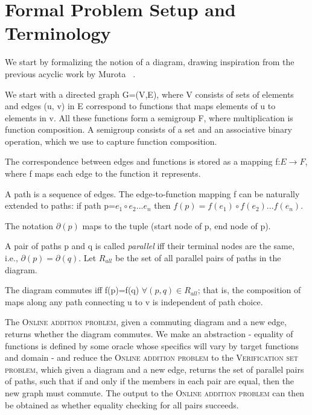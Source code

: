 \documentclass[sigplan,review,anonymous]{acmart}
\begin{document}
\section{Formal Problem Setup and Terminology}

We start by formalizing the notion of a diagram, drawing inspiration from the previous acyclic work by Murota ~\cite{commutative}.


We start with a directed graph G=(V,E), where V consists of sets of elements and edges (u, v) in E correspond to functions that maps elements of u to elements in v.
All these functions form a semigroup F, where multiplication is function composition.
A semigroup consists of a set and an associative binary operation, which we use to capture function composition.

The correspondence between edges and functions is stored as a mapping f:$E\rightarrow F$, where f maps each edge to the function it represents.

A path is a sequence of edges. The edge-to-function mapping f can be naturally extended to paths: if path p=$e_1\circ e_2 ... e_n$ then $f(p)=f(e_1) \circ f(e_2) ... f(e_n)$.

The notation $\partial(p)$ maps to the tuple (start node of p, end node of p).

A pair of paths p and q is called \textit{parallel} iff their terminal nodes are the same, i.e., $\partial(p)=\partial(q)$.
Let $R_{all}$ be the set of all parallel pairs of paths in the diagram.

The diagram commutes iff f(p)=f(q) $\forall (p,q)\in R_{all}$; that is, the composition of maps along any path connecting u to v is independent of path choice.

The \textsc{Online addition problem}, given a commuting diagram and a new edge, returns whether the diagram commutes.
We make an abstraction - equality of functions is defined by some oracle whose specifics will vary by target functions and domain - and reduce the \textsc{Online addition problem} to the \textsc{Verification set problem}, which given a diagram and a new edge, returns the set of parallel pairs of paths, such that if and only if the members in each pair are equal, then the new graph must commute. 
The output to the \textsc{Online addition problem} can then be obtained as whether equality checking for all pairs succeeds.
\end{document}
